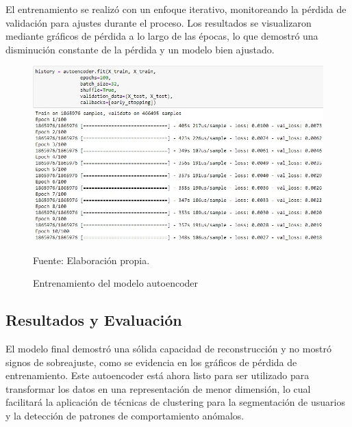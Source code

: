 El entrenamiento se realizó con un enfoque iterativo, monitoreando la pérdida de validación para ajustes durante el proceso. Los resultados se visualizaron mediante gráficos de pérdida a lo largo de las épocas, lo que demostró una disminución constante de la pérdida y un modelo bien ajustado.

\begin{figure}[H]
    \begin{minipage}[t]{0.9\textwidth}
        \caption{Entrenamiento del modelo autoencoder}
        \label{entrenamiento_autoencoder}        
    \end{minipage}

    \vspace{10pt}

    \begin{minipage}[b]{0.99\textwidth}
        \centering
        \includegraphics[width=\textwidth]{img/Entrenamiento autoencoder.jpg}        
    \end{minipage}

    \begin{minipage}[t]{0.9\textwidth}
        Fuente: Elaboración propia.
    \end{minipage}
\end{figure}

\subsection{Resultados y Evaluación}

El modelo final demostró una sólida capacidad de reconstrucción y no mostró signos de sobreajuste, como se evidencia en los gráficos de pérdida de entrenamiento. Este autoencoder está ahora listo para ser utilizado para transformar los datos en una representación de menor dimensión, lo cual facilitará la aplicación de técnicas de clustering para la segmentación de usuarios y la detección de patrones de comportamiento anómalos.

